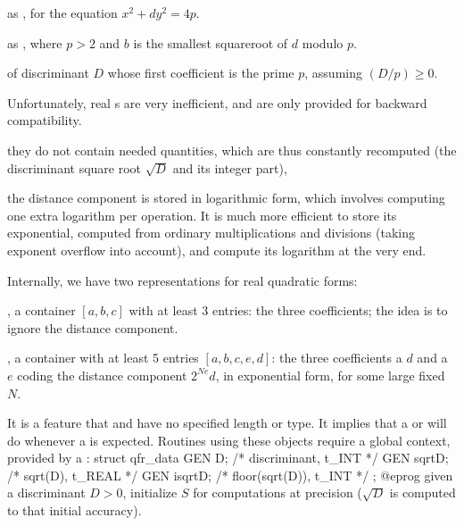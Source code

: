  as ,
for the equation $x^2 + dy^2 = 4p$.

 as
, where  $p > 2$ and $b$ is the smallest squareroot of $d$
modulo $p$.


  of discriminant $D$
whose first coefficient is the prime $p$, assuming $(D/p) \geq 0$.


 Unfortunately, real s
are very inefficient, and are only provided for backward compatibility.

\item they do not contain needed quantities, which are thus constantly
recomputed (the discriminant square root $\sqrt{D}$ and its integer part),

\item the distance component is stored in logarithmic form, which involves
computing one extra logarithm per operation. It is much more efficient
to store its exponential, computed from ordinary multiplications and
divisions (taking exponent overflow into account), and compute its logarithm
at the very end.

Internally, we have two representations for real quadratic forms:

\item {}, a container $[a,b,c]$ with at least 3 entries: the three
coefficients; the idea is to ignore the distance component.

\item {}, a container with at least 5 entries $[a,b,c,e,d]$: the
three coefficients a  $d$ and a  $e$ coding the distance
component $2^{Ne} d$, in exponential form, for some large fixed $N$.

It is a feature that  and  have no specified length or
type. It implies that a  or  will do whenever a 
is expected. Routines using these objects require a global context,
provided by a :
\bprog
  struct qfr_data {
    GEN D;        /* discriminant, t_INT   */
    GEN sqrtD;    /* sqrt(D), t_REAL       */
    GEN isqrtD;   /* floor(sqrt(D)), t_INT */
  };
@eprog
given a discriminant $D > 0$, initialize $S$ for computations at precision
 ($\sqrt{D}$ is computed to that initial accuracy).

